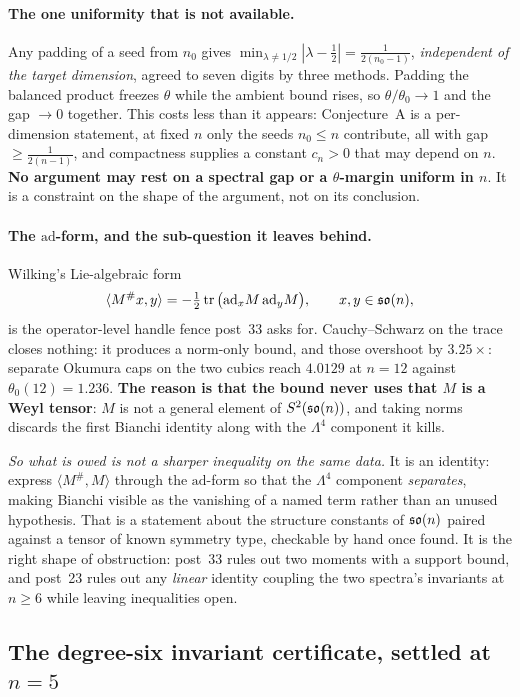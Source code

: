 \paragraph{The one uniformity that is not available.} Any padding of a seed from $n_0$ gives $\min_{\lambda\ne1/2}|\lambda-\tfrac12|=\tfrac1{2(n_0-1)}$, \emph{independent of the target dimension}, agreed to seven digits by three methods. Padding the balanced product freezes $\theta$ while the ambient bound rises, so $\theta/\theta_0\to1$ and the gap $\to0$ together. This costs less than it appears: Conjecture~A is a per-dimension statement, at fixed $n$ only the seeds $n_0\le n$ contribute, all with gap $\ge\tfrac1{2(n-1)}$, and compactness supplies a constant $c_n>0$ that may depend on $n$. \textbf{No argument may rest on a spectral gap or a $\theta$-margin uniform in $n$}. It is a constraint on the shape of the argument, not on its conclusion.



\paragraph{The $\mathrm{ad}$-form, and the sub-question it leaves behind.} Wilking's Lie-algebraic form
\[
\langle M^{\#}x,y\rangle=-\tfrac12\operatorname{tr}\big(\mathrm{ad}_xM\,\mathrm{ad}_yM\big),\qquad x,y\in\mathfrak{so}(n),
\]
is the operator-level handle fence post~33 asks for. Cauchy--Schwarz on the trace closes nothing: it produces a norm-only bound, and those overshoot by $3.25\times$: separate Okumura caps on the two cubics reach $4.0129$ at $n=12$ against $\theta_0(12)=1.236$. \textbf{The reason is that the bound never uses that $M$ is a Weyl tensor}: $M$ is not a general element of $S^2(\mathfrak{so}(n))$, and taking norms discards the first Bianchi identity along with the $\Lambda^4$ component it kills.

\emph{So what is owed is not a sharper inequality on the same data.} It is an identity: express $\langle M^{\#},M\rangle$ through the $\mathrm{ad}$-form so that the $\Lambda^4$ component \emph{separates}, making Bianchi visible as the vanishing of a named term rather than an unused hypothesis. That is a statement about the structure constants of $\mathfrak{so}(n)$ paired against a tensor of known symmetry type, checkable by hand once found. It is the right shape of obstruction: post~33 rules out two moments with a support bound, and post~23 rules out any \emph{linear} identity coupling the two spectra's invariants at $n\ge6$ while leaving inequalities open.

\subsection{The degree-six invariant certificate, settled at $n=5$}\label{sec:sos}

